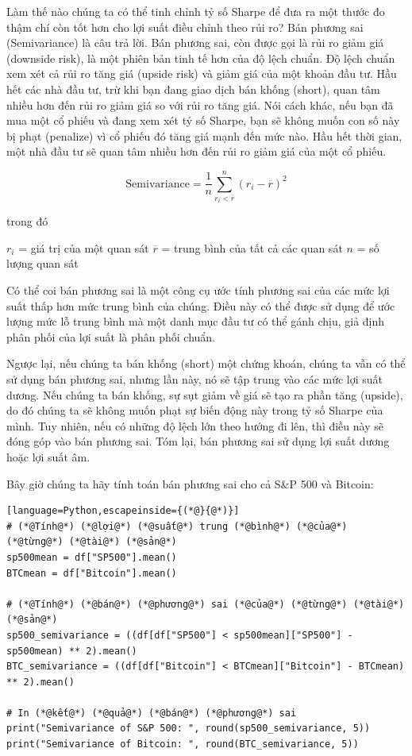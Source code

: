 Làm thế nào chúng ta có thể tinh chỉnh tỷ số Sharpe để đưa ra một thước đo thậm chí còn tốt hơn cho lợi suất điều chỉnh theo rủi ro? Bán phương sai (Semivariance) là câu trả lời. Bán phương sai, còn được gọi là rủi ro giảm giá (downside risk), là một phiên bản tinh tế hơn của độ lệch chuẩn. Độ lệch chuẩn xem xét cả rủi ro tăng giá (upside risk) và giảm giá của một khoản đầu tư. Hầu hết các nhà đầu tư, trừ khi bạn đang giao dịch bán khống (short), quan tâm nhiều hơn đến rủi ro giảm giá so với rủi ro tăng giá. Nói cách khác, nếu bạn đã mua một cổ phiếu và đang xem xét tỷ số Sharpe, bạn sẽ không muốn con số này bị phạt (penalize) vì cổ phiếu đó tăng giá mạnh đến mức nào. Hầu hết thời gian, một nhà đầu tư sẽ quan tâm nhiều hơn đến rủi ro giảm giá của một cổ phiếu.

\[\text{Semivariance} = \frac{1}{n} \sum_{r_i < \overline{r}}^{n} (r_i - \overline{r})^2\]

trong đó

$r_i$ = giá trị của một quan sát $\overline{r}$ = trung bình của tất cả các quan sát $n$ = số lượng quan sát

Có thể coi bán phương sai là một công cụ ước tính phương sai của các mức lợi suất thấp hơn mức trung bình của chúng. Điều này có thể được sử dụng để ước lượng mức lỗ trung bình mà một danh mục đầu tư có thể gánh chịu, giả định phân phối của lợi suất là phân phối chuẩn.

Ngược lại, nếu chúng ta bán khống (short) một chứng khoán, chúng ta vẫn có thể sử dụng bán phương sai, nhưng lần này, nó sẽ tập trung vào các mức lợi suất dương. Nếu chúng ta bán khống, sự sụt giảm về giá sẽ tạo ra phần tăng (upside), do đó chúng ta sẽ không muốn phạt sự biến động này trong tỷ số Sharpe của mình. Tuy nhiên, nếu có những độ lệch lớn theo hướng đi lên, thì điều này sẽ đóng góp vào bán phương sai. Tóm lại, bán phương sai sử dụng lợi suất dương hoặc lợi suất âm.

Bây giờ chúng ta hãy tính toán bán phương sai cho cả S\&P 500 và Bitcoin:

\begin{lstlisting}[language=Python,escapeinside={(*@}{@*)}]
# (*@Tính@*) (*@lợi@*) (*@suất@*) trung (*@bình@*) (*@của@*) (*@từng@*) (*@tài@*) (*@sản@*)
sp500mean = df["SP500"].mean()
BTCmean = df["Bitcoin"].mean()

# (*@Tính@*) (*@bán@*) (*@phương@*) sai (*@của@*) (*@từng@*) (*@tài@*) (*@sản@*)
sp500_semivariance = ((df[df["SP500"] < sp500mean]["SP500"] - sp500mean) ** 2).mean()
BTC_semivariance = ((df[df["Bitcoin"] < BTCmean]["Bitcoin"] - BTCmean) ** 2).mean()

# In (*@kết@*) (*@quả@*) (*@bán@*) (*@phương@*) sai
print("Semivariance of S&P 500: ", round(sp500_semivariance, 5))
print("Semivariance of Bitcoin: ", round(BTC_semivariance, 5))
\end{lstlisting}

